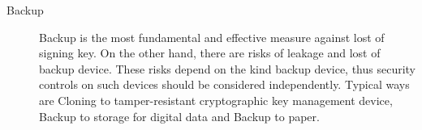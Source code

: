 \begin{description}

 \item[Backup]

       Backup is the most fundamental and effective measure against lost of signing key. On the other hand, there are  risks of leakage and lost of backup device. These risks depend on the kind backup device, thus security controls on such devices should be considered independently.
       Typical ways are Cloning to tamper-resistant cryptographic key management device, Backup to storage for digital data and Backup to paper.


\end{description}
